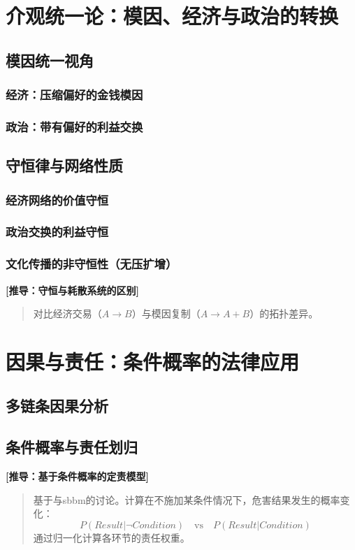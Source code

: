 \documentclass[openany]{book} %
\newenvironment{derivation}[1][数学推导与模型细节]{
	\par\vspace{1em}\noindent\textbf{\color{darkgray} [#1]} \itshape \small
	\begin{quote}\color{gray}
	}{
	\end{quote}\par\vspace{1em}
}
\begin{document}
	\chapter{介观统一论：模因、经济与政治的转换}
	\section{模因统一视角}
	\subsection{经济：压缩偏好的金钱模因}
	\subsection{政治：带有偏好的利益交换}
	\section{守恒律与网络性质}
	\subsection{经济网络的价值守恒}
	\subsection{政治交换的利益守恒}
	\subsection{文化传播的非守恒性（无压扩增）}
	\begin{derivation}[推导：守恒与耗散系统的区别]
		对比经济交易（$A \to B$）与模因复制（$A \to A+B$）的拓扑差异。
	\end{derivation}

	\chapter{因果与责任：条件概率的法律应用}
	\section{多链条因果分析}
	\section{条件概率与责任划归}
	\begin{derivation}[推导：基于条件概率的定责模型]
		基于与sbbm的讨论。计算在不施加某条件情况下，危害结果发生的概率变化：
		$$ P(Result | \neg Condition) \quad \text{vs} \quad P(Result | Condition) $$
		通过归一化计算各环节的责任权重。
	\end{derivation}
\end{document}
